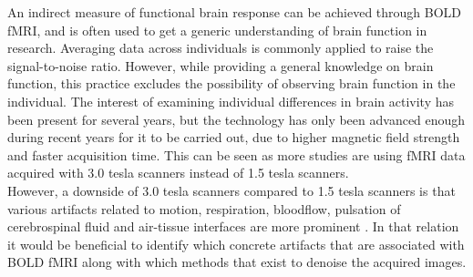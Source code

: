 An indirect measure of functional brain response can be achieved through BOLD fMRI, and is often used to get a generic understanding of brain function in research. Averaging data across individuals is commonly applied to raise the signal-to-noise ratio. However, while providing a general knowledge on brain function, this practice excludes the possibility of observing brain function in the individual. The interest of examining individual differences in brain activity has been present for several years, but the technology has only been advanced enough during recent years for it to be carried out, due to higher magnetic field strength and faster acquisition time. This can be seen as more studies are using fMRI data acquired with 3.0 tesla scanners instead of 1.5 tesla scanners. \cite{Dubois2016} \\
However, a downside of 3.0 tesla scanners compared to 1.5 tesla scanners is that various artifacts related to motion, respiration, bloodflow, pulsation of cerebrospinal fluid and air-tissue interfaces are more prominent \cite{Wood2012}. In that relation it would be beneficial to identify which concrete artifacts that are associated with BOLD fMRI along with which methods that exist to denoise the acquired images.   
